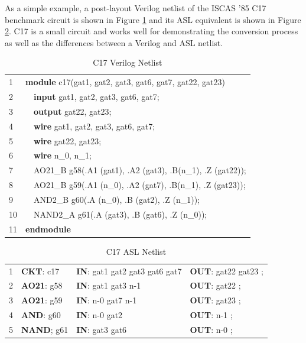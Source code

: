\documentclass[12pt]{report}
\begin{document}
As a simple example, a post-layout Verilog netlist of the ISCAS '85 C17 benchmark circuit is shown in Figure \ref{tbl:c17_verilog_netlist} and its ASL equivalent is shown in Figure \ref{tbl:c17_asl_netlist}.  C17 is a small circuit and works well for demonstrating the conversion process as well as the differences between a Verilog and ASL netlist. 
\begin{table}
  \begin{center}
    \caption{C17 Verilog Netlist}
    \begin{tabular}{|l|ll|}
      \hline
      1 & \multicolumn{2}{l|}{\textbf{module} c17(gat1, gat2, gat3, gat6, gat7, gat22, gat23)} \\
      2 & & \textbf{input} gat1, gat2, gat3, gat6, gat7; \\ 
      3 & & \textbf{output} gat22, gat23; \\ 
      4 & & \textbf{wire} gat1, gat2, gat3, gat6, gat7; \\ 
      5 & & \textbf{wire} gat22, gat23; \\ 
      6 & & \textbf{wire} n\_0, n\_1; \\ 
      7 & & AO21\_B g58(.A1 (gat1), .A2 (gat3), .B(n\_1), .Z (gat22)); \\
      8 & & AO21\_B g59(.A1 (n\_0), .A2 (gat7), .B(n\_1), .Z (gat23)); \\
      9 & & AND2\_B g60(.A (n\_0), .B (gat2), .Z (n\_1)); \\ 
      10 & & NAND2\_A g61(.A (gat3), .B (gat6), .Z (n\_0)); \\ 
      11 & \multicolumn{2}{l|}{\textbf{endmodule}} \\ 
      \hline
    \end{tabular}
  \end{center}
	\label{tbl:c17_verilog_netlist}
\end{table}
\begin{table}
  \begin{center}
    \caption{C17 ASL Netlist}
    \begin{tabular}{|l|lll|}
      \hline
      1 & \textbf{CKT}: c17 & \textbf{IN}: gat1 gat2 gat3 gat6 gat7 & \textbf{OUT}: gat22 gat23 ; \\
      2 & \textbf{AO21}: g58 & \textbf{IN}: gat1 gat3 n-1 & \textbf{OUT}: gat22 ; \\  
      3 & \textbf{AO21}: g59 & \textbf{IN}: n-0 gat7 n-1 & \textbf{OUT}: gat23 ; \\  
      4 & \textbf{AND}: g60 & \textbf{IN}: n-0 gat2 & \textbf{OUT}: n-1 ; \\  
      5 & \textbf{NAND}; g61 & \textbf{IN}: gat3 gat6 & \textbf{OUT}: n-0 ; \\ 
      \hline
    \end{tabular}
  \end{center}
  \label{tbl:c17_asl_netlist}
\end{table}
\end{document}
